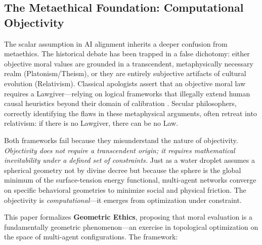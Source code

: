 \documentclass[12pt,letterpaper]{article}
\theoremstyle{definition}
\theoremstyle{remark}
\begin{document}
\subsection{The Metaethical Foundation: Computational Objectivity}

The scalar assumption in AI alignment inherits a deeper confusion from metaethics. The historical debate has been trapped in a false dichotomy: either objective moral values are grounded in a transcendent, metaphysically necessary realm (Platonism/Theism), or they are entirely subjective artifacts of cultural evolution (Relativism). Classical apologists assert that an objective moral law requires a Lawgiver---relying on logical frameworks that illegally extend human causal heuristics beyond their domain of calibration \cite{bond2026pragmatist}. Secular philosophers, correctly identifying the flaws in these metaphysical arguments, often retreat into relativism: if there is no Lawgiver, there can be no Law.

Both frameworks fail because they misunderstand the nature of objectivity. \emph{Objectivity does not require a transcendent origin; it requires mathematical inevitability under a defined set of constraints.} Just as a water droplet assumes a spherical geometry not by divine decree but because the sphere is the global minimum of the surface-tension energy functional, multi-agent networks converge on specific behavioral geometries to minimize social and physical friction. The objectivity is \emph{computational}---it emerges from optimization under constraint.

This paper formalizes \textbf{Geometric Ethics}, proposing that moral evaluation is a fundamentally geometric phenomenon---an exercise in topological optimization on the space of multi-agent configurations. The framework:
\end{document}
